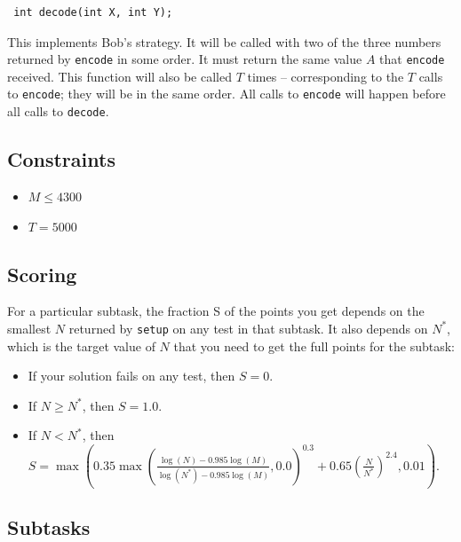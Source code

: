 \documentclass[12pt]{article}
\begin{document}
\begin{lstlisting}
 int decode(int X, int Y);
\end{lstlisting}

This implements Bob's strategy. It will be called with two of the three numbers returned by \texttt{encode} in some order. It must return the same value $A$ that \texttt{encode} received. This function will also be called $T$ times -- corresponding to the $T$ calls to \texttt{encode}; they will be in the same order. All calls to \texttt{encode} will happen before all calls to \texttt{decode}.

\subsection{Constraints}

\begin{itemize}
\item $M \leq 4300$
\item $T = 5000$
\end{itemize}

\subsection{Scoring}

For a particular subtask, the fraction S of the points you get depends on the smallest $N$ returned by \texttt{setup} on any test in that subtask. It also depends on $N^*$, which is the target value of $N$ that you need to get the full points for the subtask:

\begin{itemize}
\item If your solution fails on any test, then $S = 0$.
\item If $N \geq N^*$, then $S = 1.0$.
\item If $N < N^*$, then $S = \max\left(0.35 \max\left(\frac{\log(N) - 0.985 \log(M)}{\log(N^*) - 0.985 \log(M)}, 0.0\right)^{0.3} + 0.65 \left(\frac{N}{N^*}\right)^{2.4}, 0.01\right)$.
\end{itemize}

\subsection{Subtasks}
\end{document}

